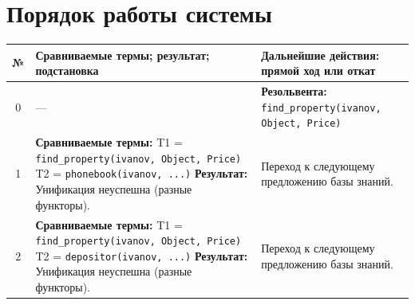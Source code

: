 \section{Порядок работы системы}
\renewcommand{\arraystretch}{1.5}
\begin{tabularx}{\textwidth}{|c|X|X|}
	\hline
	\textbf{№}                                                                                          & \textbf{Сравниваемые термы; результат; подстановка} & \textbf{Дальнейшие действия: прямой ход или откат} \\
	\hline
	0                                                                                                   &
	—                                                                                                   &
	\textbf{Резольвента:} \newline
	\texttt{find\_property(ivanov, Object, Price)}                                                                                                                                                                 \\
	\hline

	1                                                                                                   &
	\textbf{Сравниваемые термы:} \newline
	T1 = \texttt{find\_property(ivanov, Object, Price)} \newline
	T2 = \texttt{phonebook(ivanov, ...)} \newline
	\textbf{Результат:} Унификация неуспешна (разные функторы).                                         &
	Переход к следующему предложению базы знаний.                                                                                                                                                                  \\
	\hline

	2                                                                                                   &
	\textbf{Сравниваемые термы:} \newline
	T1 = \texttt{find\_property(ivanov, Object, Price)} \newline
	T2 = \texttt{depositor(ivanov, ...)} \newline
	\textbf{Результат:} Унификация неуспешна (разные функторы).                                         &
	Переход к следующему предложению базы знаний.                                                                                                                                                                  \\
	\hline


\end{tabularx}
